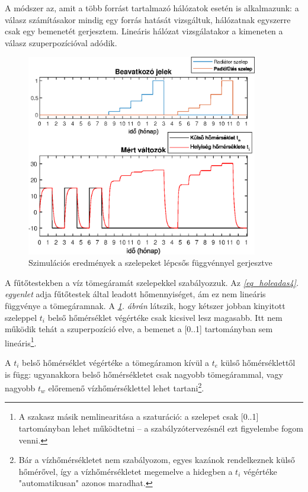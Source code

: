 A módszer az, amit a több forrást tartalmazó hálózatok esetén is alkalmazunk: a válasz számításakor mindig egy forrás hatását vizsgáltuk,  hálózatnak egyszerre csak egy bemenetét gerjesztem. Lineáris hálózat vizsgálatakor a kimeneten a válasz szuperpozícióval adódik. 

\begin{figure}[H]
	\centering
	\includegraphics[trim=0 0 0 0, clip,width=0.9\textwidth]{figures/valve-stair}
	\caption{Szimulációs eredmények a szelepeket lépcsős függvénnyel gerjesztve}
	\label{fig:valve-stair}
\end{figure}

A fűtőtestekben a víz tömegáramát szelepekkel szabályozzuk. Az \textit{\ref{eq_holeadas4}. egyenlet} adja fűtőtestek által leadott hőmennyiséget, ám ez nem lineáris függvénye a tömegáramnak. A \textit{\ref{fig:valve-stair}. ábrán} látszik, hogy kétszer jobban kinyitott szeleppel $t_i$ belső hőmérséklet végértéke csak kicsivel lesz magasabb. Itt nem működik tehát a szuperpozíció elve, a bemenet a [0..1] tartományban sem lineáris\footnote{A szakasz másik nemlinearitása a szaturáció: a szelepet csak [0..1] tartományban lehet működtetni -- a szabályzótervezésnél ezt figyelembe fogom venni.}.

A $t_i$ belső hőmérséklet végértéke a tömegáramon kívül a $t_e$ külső hőmérséklettől is függ: ugyanakkora belső hőmérsékletet csak nagyobb tömegárammal, vagy nagyobb $t_w$ előremenő vízhőmérséklettel lehet tartani\footnote{Bár a vízhőmérsékletet nem szabályozom, egyes kazánok rendelkeznek külső hőmérővel, így a vízhőmérsékletet megemelve a hidegben a $t_i$ végértéke "automatikusan" azonos maradhat.}. 

